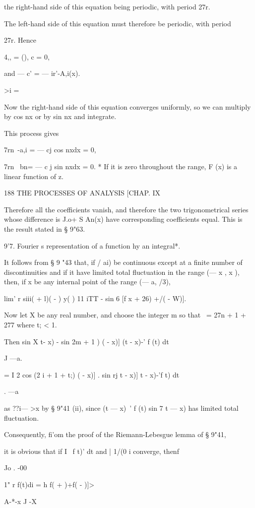 {the right-hand side of this equation being periodic, with period 27r.

The left-hand side of this equation must therefore be periodic, with
period

27r. Hence

 4,, = (), c = 0,

and — c' = — ir'-A,i(x).

>i = \

Now the right-hand side of this equation converges uniformly, so we
can multiply by cos nx or by sin nx and integrate.

This process gives

7rn~-a,i = — cj cos nxdx = 0,

7rn~ bn= — c j sin nxdx = 0. * If it is zero throughout the range, F
(x) is a linear function of z.

188 THE PROCESSES OF ANALYSIS [CHAP. IX

Therefore all the coefficients vanish, and therefore the two
trigonometrical series whose difference is J.o+ S An(x) have
corresponding coefficients equal. This is the result stated in § 9"63.

9'7. Fourier s representation of a function hy an integral*.

It follows from § 9 "43 that, if / ai) be continuous except at a
finite number of discontinuities and if it have limited total
fluctuation in the range (— x , x ), then, if x be any internal point
of the range (— a, /3),

lim' r siii( + l)( - ) y( ) 11 iTT - sin 6 [f x + 26) +/( - W)].

Now let X be any real number, and choose the integer m so that \ = 27n
+ 1 + 277 where t; < 1.

Then sin X t- x) - sin 2m + 1 ) ( - x)] (t - x)-' f (t) dt

J —a.

= I 2 cos (2 i + 1 + t;) ( - x)] . sin rj t - x)] t - x)-'f t) dt

. —a

as ??i— >x by § 9"41 (ii), since (t — x)~' f (t) sin 7 t — x) has
limited total fluctuation.

Consequently, fi'om the proof of the Riemann-Lebesgue lemma of § 9"41,

it is obvious that if I \ f t)' dt and | 1/(0 i converge, thenf

Jo . -00

1" r f(t)di = h f( + )+f( - )]>

A-*-x J -X

}
